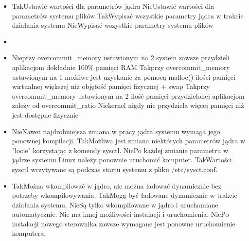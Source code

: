\begin{itemize}
	\newpage
	\item {}
	{Tak}{Ustawić wartości dla parametrów jądra}
	{Nie}{Ustawić wartości dla parametrów systemu plików}
	{Tak}{Wypisać wszystkie parametry jądra w trakcie działania systemu}
	{Nie}{Wypisać wszystkie parametry systemu plików}
	

	
	\item {}
	
	\item {}
	{Nie}{przy overcommit\_memory ustawionym na 2 system zawsze przydzieli aplikacjom dokładnie 100\% pamięci RAM}
	{Tak}{przy overcommit\_memory ustawionym na 1 możliwe jest uzyskanie za pomocą malloc() ilości pamięci wirtualnej większej niż objętość pamięci fizycznej + swap}
	{Tak}{przy overcommit\_memory ustawionym na 2 ilość pamięci przydzielonej aplikacjom zależy od overcommit\_ratio}
	{Nie}{kernel nigdy nie przydziela więcej pamięci niż jest dostępne fizycznie}
	
	\item {}
	{Nie}{Nawet najdrobniejsza zmiana w pracy jądra systemu wymaga jego ponownej kompilacji.}
	{Tak}{Możliwa jest zmiana niektórych parametrów jądra w "locie" korzystając z komendy sysctl.}
	{Nie}{Po każdej zmianie parametru w jądrze systemu Linux należy ponownie uruchomić komputer.}
	{Tak}{Wartości sysctl wczytywane są podczas startu systemu z pliku /etc/sysct.conf.}
	
	\item {}
	{Tak}{Można wkompilować w jądro, ale można ładować dynamicznie bez potrzeby wkompilowywania.}
	{Tak}{Mogą być ładowane dynamicznie w trakcie działania systemu.}
	{Nie}{Są tylko wkompilowane w jądro i uruchamiane automatycznie. Nie ma innej możliwości instalacji i uruchomienia.}
	{Nie}{Po instalacji nowego sterownika zawsze wymagane jest ponowne uruchomienie komputera.}
	

\end{itemize}
